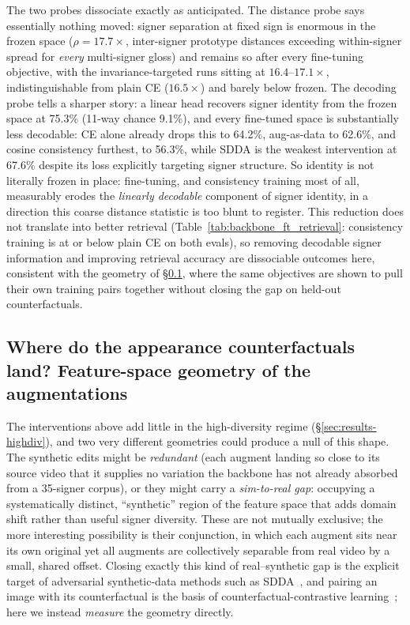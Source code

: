 The two probes dissociate exactly as anticipated. The distance probe says
essentially nothing moved: signer separation at fixed sign is enormous in
the frozen space ($\rho = 17.7\times$, inter-signer prototype distances
exceeding within-signer spread for \emph{every} multi-signer gloss) and
remains so after every fine-tuning objective, with the invariance-targeted
runs sitting at $16.4$--$17.1\times$, indistinguishable from plain CE
($16.5\times$) and barely below frozen. The decoding probe tells a
sharper story: a linear head recovers signer identity from the frozen
space at 75.3\% (11-way chance 9.1\%), and every fine-tuned space is
substantially less decodable: CE alone already drops this to 64.2\%,
aug-as-data to 62.6\%, and cosine consistency furthest, to 56.3\%, while
SDDA is the weakest intervention at 67.6\% despite its loss explicitly
targeting signer structure. So identity is not literally frozen in place:
fine-tuning, and consistency training most of all, measurably erodes the
\emph{linearly decodable} component of signer identity, in a direction
this coarse distance statistic is too blunt to register. This reduction
does not translate into better retrieval (Table~\ref{tab:backbone_ft_retrieval}:
consistency training is at or below plain CE on both evals), so removing
decodable signer information and improving retrieval accuracy are
dissociable outcomes here, consistent with the geometry of
\S\ref{sec:results-aug-geometry}, where the same objectives are shown to
pull their own training pairs together without closing the gap on
held-out counterfactuals.

\subsection{Where do the appearance counterfactuals land? Feature-space
geometry of the augmentations}
\label{sec:results-aug-geometry}
The interventions above add little in the high-diversity regime (\S\ref{sec:results-highdiv}),
and two very different geometries could produce a null of this shape. The
synthetic edits might be \emph{redundant} (each augment landing so close
to its source video that it supplies no variation the backbone has not
already absorbed from a 35-signer corpus), or they might carry a
\emph{sim-to-real gap}: occupying a systematically distinct, ``synthetic''
region of the feature space that adds domain shift rather than useful signer
diversity. These are not mutually exclusive; the more interesting possibility
is their conjunction, in which each augment sits near its own original yet all
augments are collectively separable from real video by a small, shared
offset. Closing exactly this kind of real--synthetic gap is the explicit
target of adversarial synthetic-data methods such as
SDDA~\cite{fuSignerDiversitydrivenData2024b}, and pairing an image with its
counterfactual is the basis of counterfactual-contrastive
learning~\cite{roschewitzCounterfactualContrastiveLearning2025}; here we
instead \emph{measure} the geometry directly.

